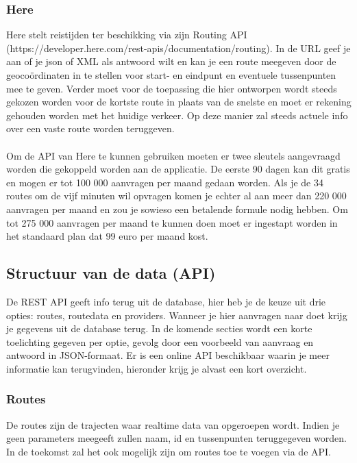 \documentclass[ps,a4paper,oneside]{report}
\begin{document}
\subsubsection{Here}
Here stelt reistijden ter beschikking via zijn Routing API \\(https://developer.here.com/rest-apis/documentation/routing). In de URL geef je aan of je json of XML als antwoord wilt en kan je een route meegeven door de geoco\"ordinaten in te stellen voor start- en eindpunt en eventuele tussenpunten mee te geven. Verder moet voor de toepassing die hier ontworpen wordt steeds gekozen worden voor de kortste route in plaats van de snelste en moet er rekening gehouden worden met het huidige verkeer. Op deze manier zal steeds actuele info over een vaste route worden teruggeven.\\\\
Om de API van Here te kunnen gebruiken moeten er twee sleutels aangevraagd worden die gekoppeld worden aan de applicatie. De eerste 90 dagen kan dit gratis en mogen er tot 100 000 aanvragen per maand gedaan worden. Als je de 34 routes om de vijf minuten wil opvragen komen je echter al aan meer dan 220 000 aanvragen per maand en zou je sowieso een betalende formule nodig hebben. Om tot 275 000 aanvragen per maand te kunnen doen moet er ingestapt worden in het standaard plan dat 99 euro per maand kost.\\
\subsection{Structuur van de data (API)}
De REST API geeft info terug uit de database, hier heb je de keuze uit drie opties: routes, routedata en providers. Wanneer je hier aanvragen naar doet krijg je gegevens uit de database terug. In de komende secties wordt een korte toelichting gegeven per optie, gevolg door een voorbeeld van aanvraag en antwoord in JSON-formaat. Er is een online API beschikbaar waarin je meer informatie kan terugvinden, hieronder krijg je alvast een kort overzicht.

\subsubsection{Routes}
De routes zijn de trajecten waar realtime data van opgeroepen wordt. Indien je geen parameters meegeeft zullen naam, id en tussenpunten teruggegeven worden. In de toekomst zal het ook mogelijk zijn om routes toe te voegen via de API.\\
\end{document}
